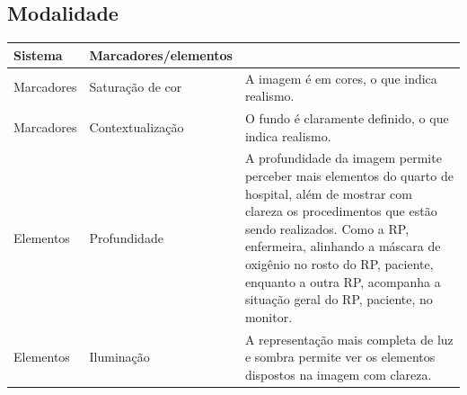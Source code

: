 \documentclass[aspectratio=169]{article}
\begin{document}
\subsection{Modalidade}

\begin{table}[H]
\begin{tabular}{p{} p{} p{}} \hline
Sistema & Marcadores/elementos \\ \hline \hline
Marcadores & Saturação de cor & A imagem é em cores, o que indica realismo. \\ \hline
Marcadores & Contextualização & O fundo é claramente definido, o que indica realismo. \\ \hline
Elementos & Profundidade & A profundidade da imagem permite perceber mais elementos do quarto de hospital, além de mostrar com clareza os procedimentos que estão sendo realizados. Como a RP, enfermeira, alinhando a máscara de oxigênio no rosto do RP, paciente, enquanto a outra RP, acompanha a situação geral do RP, paciente, no  monitor. \\ \hline
Elementos & Iluminação & A representação mais completa de luz e sombra permite ver os elementos dispostos na imagem com clareza. \\ \hline
\end{tabular}
\end{table}


%

\end{document}
